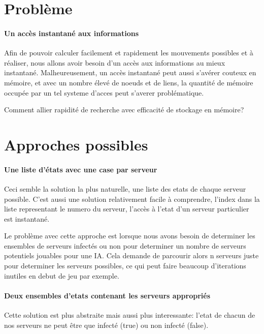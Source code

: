 \documentclass{scrreprt}
\begin{document}
    \section{Problème}

    \paragraph{Un accès instantané aux informations}
    Afin de pouvoir calculer facilement et rapidement les mouvements
    possibles et à réaliser, nous allons avoir besoin d'un accès aux
    informations au mieux instantané.
    Malheureusement, un accès instantané peut aussi s'avérer couteux en
    mémoire, et avec un nombre élevé de noeuds et de liens, la quantité de
    mémoire occupée par un tel systeme d'acces peut s'averer problématique.

    Comment allier rapidité de recherche avec efficacité de stockage en mémoire?

    \section{Approches possibles}

    \paragraph{Une liste d'états avec une case par serveur}
    Ceci semble la solution la plus naturelle, une liste des etats de chaque
    serveur possible.
    C'est aussi une solution relativement facile à
    comprendre, l'index dans la liste representant le numero du serveur,
    l'accès à l'etat d'un serveur particulier est instantané.

    Le problème avec cette approche est lorsque nous avons besoin de
    determiner les ensembles de serveurs infectés ou non pour determiner un
    nombre de serveurs potentiels jouables pour une IA.
    Cela demande de parcourir alors n serveurs juste pour determiner les
    serveurs possibles, ce qui peut faire beaucoup d'iterations inutiles en
    debut de jeu par exemple.


    \paragraph{Deux ensembles d'etats contenant les serveurs appropriés}
    Cette solution est plus abstraite mais aussi plus interessante: l'etat de
    chacun de nos serveurs ne peut être que infecté (true) ou non infecté
    (false).
\end{document}

